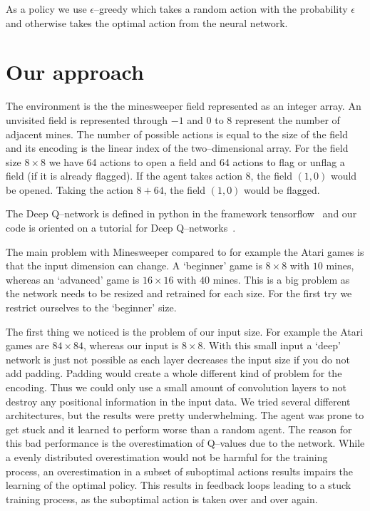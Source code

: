 As a policy we use $\epsilon$--greedy which takes a random action with the probability $\epsilon$ and otherwise takes the optimal action from the neural network.

\section{Our approach}
The environment is the the minesweeper field represented as an integer array.
An unvisited field is represented through $-1$ and $0$ to $8$ represent the number of adjacent mines.
The number of possible actions is equal to the size of the field and its encoding is the linear index of the two--dimensional array.
For the field size $8 \times 8$ we have 64 actions to open a field and 64 actions to flag or unflag a field (if it is already flagged).
If the agent takes action $8$, the field $(1, 0)$ would be opened.
Taking the action $8+64$, the field $(1, 0)$ would be flagged.

The Deep Q--network is defined in python in the framework tensorflow~\cite{tensorflow2015-whitepaper} and our code is oriented on a tutorial for Deep Q--networks~\cite{SimpleReLe}.

The main problem with Minesweeper compared to for example the Atari games is that the input dimension can change.
A `beginner' game is $8 \times 8$ with $10$ mines, whereas an `advanced' game is $16 \times 16$ with $40$ mines.
This is a big problem as the network needs to be resized and retrained for each size.
For the first try we restrict ourselves to the `beginner' size.

The first thing we noticed is the problem of our input size.
For example the Atari games are $84 \times 84$, whereas our input is $8 \times 8$.
With this small input a `deep' network is just not possible as each layer decreases the input size if you do not add padding.
Padding would create a whole different kind of problem for the encoding.
Thus we could only use a small amount of convolution layers to not destroy any positional information in the input data.
We tried several different architectures, but the results were pretty underwhelming.
The agent was prone to get stuck and it learned to perform worse than a random agent.
The reason for this bad performance is the overestimation of Q--values due to the network.
While a evenly distributed overestimation would not be harmful for the training process, an overestimation in a subset of suboptimal actions results impairs the learning of the optimal policy.
This results in feedback loops leading to a stuck training process, as the suboptimal action is taken over and over again.

